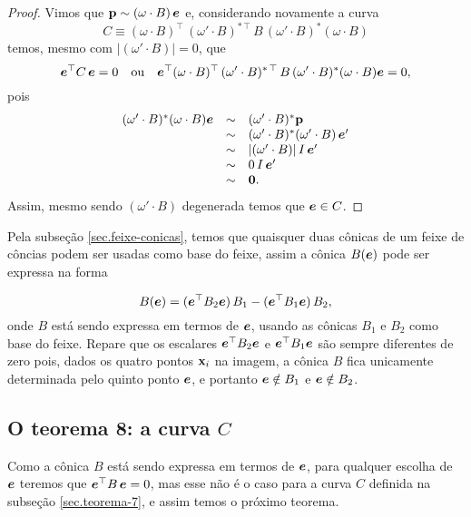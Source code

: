 \begin{proof}
 
Vimos que ${\bf p}\sim (\omega\cdot B)\,\boldsymbol{e}$ e, considerando novamente a curva 
\begin{equation*}
C \equiv (\omega \cdot B)^\top\,(\omega' \cdot B)^{*\,\top}\,B\,(\omega' \cdot B)^*(\omega \cdot B)
\end{equation*}                                      
temos, mesmo com  $|(\omega' \cdot B)|=0$, que
\begin{equation*}
\boldsymbol{e}^\top C\,\boldsymbol{e}=0\quad\text{ou}\quad
\boldsymbol{e}^\top (\omega \cdot B)^\top\,(\omega' \cdot B)^{*\,\top}\,B\,(\omega' \cdot B)^*(\omega \cdot B)\boldsymbol{e}=0,
\end{equation*}                                                pois
\begin{equation*}
\begin{array}{rcl}
(\omega' \cdot B)^*(\omega \cdot B)\boldsymbol{e}&\sim &(\omega' \cdot B)^*{\bf p}\\
&\sim &(\omega' \cdot B)^*(\omega'\cdot B)\,\boldsymbol{e}'\\
&\sim&|(\omega' \cdot B)|\,I\,\boldsymbol{e}'\\
&\sim&0\,I\,\boldsymbol{e}'\\
&\sim&{\bf 0}.
\end{array}
\end{equation*}
Assim, mesmo sendo $(\omega' \cdot B)$ degenerada temos que $\boldsymbol{e}\in C$.                                   
\end{proof}

Pela subseção \ref{sec.feixe-conicas}, temos que quaisquer duas cônicas de um feixe de côncias podem ser usadas como base do feixe, assim a cônica $B(\boldsymbol{e})$ pode ser expressa na forma

\begin{equation*}
B(\boldsymbol{e})=(\boldsymbol{e}^\top B_2\boldsymbol{e})\,B_1-(\boldsymbol{e}^\top B_1\boldsymbol{e})\,B_2,
\end{equation*} 
onde $B$ está sendo expressa em termos de $\boldsymbol{e}$, usando as cônicas $B_1$ e $B_2$ como base do feixe. Repare que os escalares $\boldsymbol{e}^\top B_2\boldsymbol{e}$ e $\boldsymbol{e}^\top B_1\boldsymbol{e}$ são sempre diferentes de zero pois, dados os quatro pontos $\mathbf{x}_i$ na imagem, a cônica $B$ fica unicamente determinada pelo quinto ponto $\boldsymbol{e}$, e portanto $\boldsymbol{e}\notin B_1$ e $\boldsymbol{e}\notin B_2$.


\subsection{O teorema 8: a curva $C$}
Como a cônica $B$ está sendo expressa em termos de $\boldsymbol{e}$, para qualquer escolha de $\boldsymbol{e}$ teremos que $\boldsymbol{e}^\top B\,\boldsymbol{e}=0$, mas esse não é o caso para a curva $C$ definida na subseção \ref{sec.teorema-7}, e assim temos o próximo teorema.

